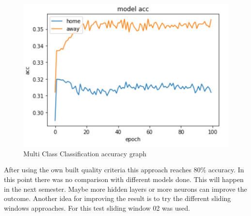 \begin{figure}[H]
\begin{center}
\includegraphics[scale=1.5]{images/mccacc.PNG}
\end{center}
\caption{Multi Class Classification accuracy graph}
\label{mccacc}
\end{figure}

After using the own built quality criteria this approach reaches 80\% accuracy. In this point there was no comparison with different models done. This will happen in the next semester. Maybe more hidden layers or more neurons can improve the outcome. Another idea for improving the result is to try the different sliding windows approaches. For this test sliding window 02 was used. 


